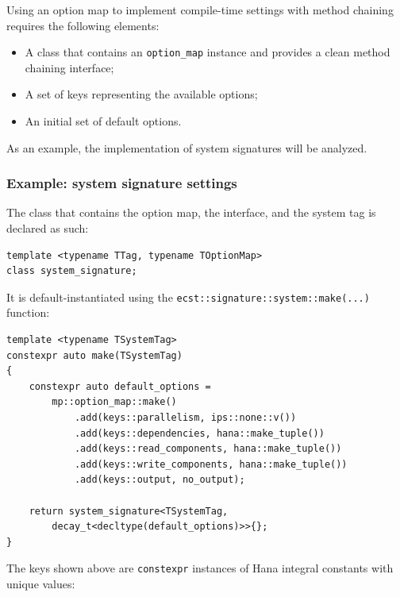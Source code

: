 \documentclass[twoside, 12pt, a4paper, openright]{book}
\begin{document}
Using an option map to implement compile-time settings with method
chaining requires the following elements:

\begin{itemize}
\item
  A class that contains an
  \texttt{option_map}
  instance and provides a clean method chaining interface;
\item
  A set of keys representing the available options;
\item
  An initial set of default options.
\end{itemize}

As an example, the implementation of system signatures will be analyzed.

\subsubsection{Example: system signature
settings}\label{example-system-signature-settings}

The class that contains the option map, the interface, and the system
tag is declared as such:

\begin{verbatim}
template <typename TTag, typename TOptionMap>
class system_signature;
\end{verbatim}

It is default-instantiated using the
\texttt{ecst::signature::system::make(...)}
function:

\begin{verbatim}
template <typename TSystemTag>
constexpr auto make(TSystemTag)
{
    constexpr auto default_options =
        mp::option_map::make()
            .add(keys::parallelism, ips::none::v())
            .add(keys::dependencies, hana::make_tuple())
            .add(keys::read_components, hana::make_tuple())
            .add(keys::write_components, hana::make_tuple())
            .add(keys::output, no_output);

    return system_signature<TSystemTag,
        decay_t<decltype(default_options)>>{};
}
\end{verbatim}

The keys shown above are
\texttt{constexpr}
instances of Hana integral constants with unique values:
\end{document}
